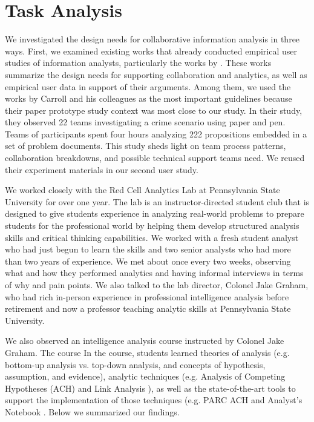 \section{Task Analysis}

We investigated the design needs for collaborative information analysis in three ways. First, we examined existing works that already conducted empirical user studies of information analysts, particularly the works by \citep{Chin2009,Carroll2013,Pirolli2005, Kang2012,Kang2012d}. These works summarize the design needs for supporting collaboration and analytics, as well as empirical user data in support of their arguments. Among them, we used the works by Carroll and his colleagues \citep{Carroll2013,Borge2012,Borge2014} as the most important guidelines because their paper prototype study context was most close to our study. In their study, they observed 22 teams investigating a crime scenario using paper and pen. Teams of participants spent four hours analyzing 222 propositions embedded in a set of problem documents. This study sheds light on team process patterns, collaboration breakdowns, and possible technical support teams need. We reused their experiment materials in our second user study.

We worked closely with the Red Cell Analytics Lab at Pennsylvania State University for over one year. The lab is an instructor-directed student club that is designed to give students experience in analyzing real-world problems to prepare students for the professional world by helping them develop structured analysis skills and critical thinking capabilities. We worked with a fresh student analyst who had just begun to learn the skills and two senior analysts who had more than two years of experience. We met about once every two weeks, observing what and how they performed analytics and having informal interviews in terms of why and pain points.  We also talked to the lab director, Colonel Jake Graham, who had rich in-person experience in professional intelligence analysis before retirement and now a professor teaching analytic skills at Pennsylvania State University. 

We also observed an intelligence analysis course instructed by Colonel Jake Graham. The course  In the course, students learned theories of analysis (e.g. bottom-up analysis vs. top-down analysis, and concepts of hypothesis, assumption, and evidence), analytic techniques (e.g. Analysis of Competing Hypotheses (ACH) \citep{Heuer1999} and Link Analysis \citep{Sparrow1991}), as well as the state-of-the-art tools to support the implementation of those techniques (e.g. PARC ACH \citep{PARC} and Analyst’s Notebook \citep{IBM}. Below we summarized our findings.

